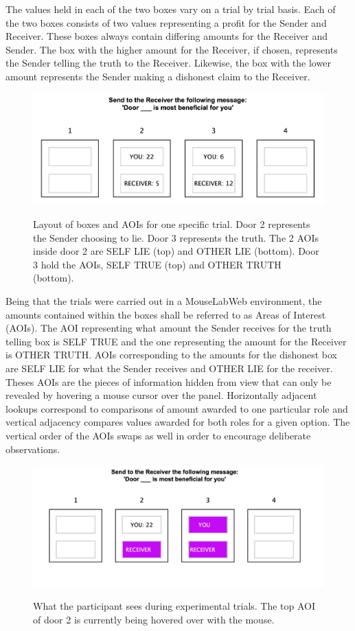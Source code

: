 \documentclass[man, floatsintext]{apa7}
\begin{document}
The values held in each of the two boxes vary on a trial by trial basis. Each of the two boxes consists of two values representing a profit for the Sender and Receiver. These boxes always contain differing amounts for the Receiver and Sender. The box with the higher amount for the Receiver, if chosen, represents the Sender telling the truth to the Receiver. Likewise, the box with the lower amount represents the Sender making a dishonest claim to the Receiver.

\begin{figure}[H]
	\centering
	\includegraphics[width=0.75\linewidth]{figures/NOT HIDDEN.png}
	\label{fig:AOIs}
	\caption{Layout of boxes and AOIs for one specific trial. Door 2 represents the Sender choosing to lie. Door 3 represents the truth. The 2 AOIs inside door 2 are SELF LIE (top) and OTHER LIE (bottom). Door 3 hold the AOIs, SELF TRUE (top) and OTHER TRUTH (bottom).}
\end{figure}


Being that the trials were carried out in a MouseLabWeb environment, the amounts contained within the boxes shall be referred to as Areas of Interest (AOIs). The AOI representing what amount the Sender receives for the truth telling box is SELF TRUE and the one representing the amount for the Receiver is OTHER TRUTH. AOIs corresponding to the amounts for the dishonest box are SELF LIE for what the Sender receives and OTHER LIE for the receiver. Theses AOIs are the pieces of information hidden from view that can only be revealed by hovering a mouse cursor over the panel. Horizontally adjacent lookups correspond to comparisons of amount awarded to one particular role and vertical adjacency compares values awarded for both roles for a given option. The vertical order of the AOIs swaps as well in order to encourage deliberate observations.

\begin{figure}[H]
	\centering
	\includegraphics[width=0.75\linewidth]{figures/HIDDEN.png}
	\label{fig:HiddenAOIs}
	\caption{What the participant sees during experimental trials. The top AOI of door 2 is currently being hovered over with the mouse.}
\end{figure}
\end{document}
